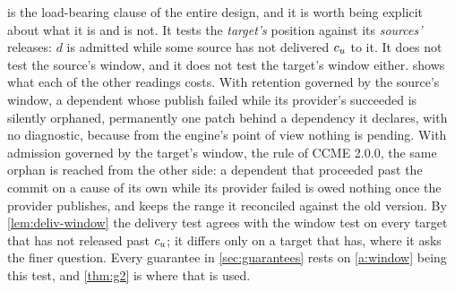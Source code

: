  is the load-bearing clause of the entire design, and it is
worth being explicit about what it is and is not. It tests the \emph{target's}
position against its \emph{sources'} releases: $d$ is admitted while some
source has not delivered $c_{u}$ to it. It does not test the source's window,
and it does not test the target's window either.  shows what each
of the other readings costs. With retention governed by the source's window, a
dependent whose publish failed while its provider's succeeded is silently
orphaned, permanently one patch behind a dependency it declares, with no
diagnostic, because from the engine's point of view nothing is pending. With
admission governed by the target's window, the rule of CCME 2.0.0, the same
orphan is reached from the other side: a dependent that proceeded past the
commit on a cause of its own while its provider failed is owed nothing once
the provider publishes, and keeps the range it reconciled against the old
version. By \cref{lem:deliv-window} the delivery test agrees with the window
test on every target that has not released past $c_{u}$; it differs only on
a target that has, where it asks the finer question. Every guarantee in
\cref{sec:guarantees} rests on \cref{a:window} being this test, and
\cref{thm:g2} is where that is used.

